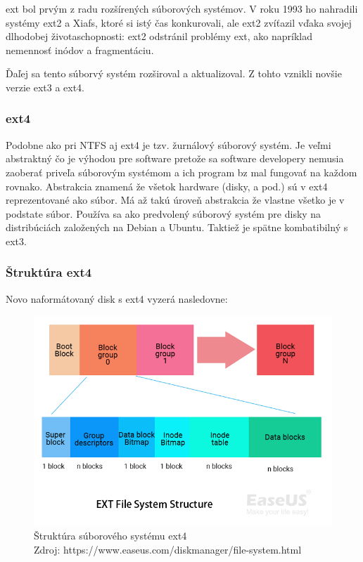\documentclass[12pt,oneside,slovak,a4paper]{article}
\begin{document}
ext bol prvým z radu rozšírených súborových systémov. V roku 1993 ho nahradili systémy ext2 a Xiafs, ktoré si istý čas konkurovali, ale ext2 zvíťazil vďaka svojej dlhodobej životaschopnosti: ext2 odstránil problémy ext, ako napríklad nemennosť inódov a fragmentáciu.

Ďaľej sa tento súborvý systém rozširoval a aktualizoval. Z tohto vznikli novšie verzie ext3 a ext4.

\subsubsection{ext4}
Podobne ako pri NTFS aj ext4 je tzv. žurnálový súborový systém. Je veľmi abstraktný čo je výhodou pre software pretože sa software developery nemusia zaoberať priveľa súborovým systémom a ich program bz mal fungovať na každom rovnako. Abstrakcia znamená že všetok hardware (disky, a pod.) sú v ext4 reprezentované ako súbor. Má až takú úroveň abstrakcia že vlastne všetko je v podstate súbor. Používa sa ako predvolený súborový systém pre disky na distribúciách založených na Debian a Ubuntu. Taktiež je spätne kombatibilný s ext3.

\subsubsection{Štruktúra ext4}
Novo naformátovaný disk s ext4 vyzerá nasledovne:

\begin{figure}[H]
	\centering
	\captionsetup{justification=centering,margin=2cm}
	\includegraphics[width=\linewidth]{./images/file_system_structure/ext-file-system-structure.png}
	\centering
	\caption{Štruktúra súborového systému ext4 \\ Zdroj: https://www.easeus.com/diskmanager/file-system.html}
\end{figure}
\end{document}
